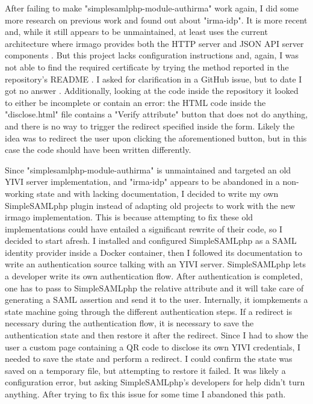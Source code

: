 \documentclass{report}
\begin{document}
After failing to make "simplesamlphp-module-authirma" work again, I did some more research on previous work and found out about "irma-idp". It is more recent and, while it still
appears to be unmaintained, at least uses the current architecture where irmago provides both the HTTP server and JSON API server components \cite{irma-docs-server}. But this
project lacks configuration instructions and, again, I was not able to find the required certificate by trying the method reported in the repository's README \cite{irma-idp}. I asked for 
clarification in a GitHub issue, but to date I got no answer \cite{irma-idp-issue}. Additionally, looking at the code inside the repository it looked to either be incomplete or
contain an error: the HTML code inside the "disclose.html" file contains a "Verify attribute" button that does not do anything, and there is no way to trigger the redirect specified
inside the form. Likely the idea was to redirect the user upon clicking the aforementioned button, but in this case the code should have been written differently. \par
Since "simplesamlphp-module-authirma" is unmaintained and targeted an old YIVI server implementation, and "irma-idp" appears to be abandoned in a non-working state and with lacking
documentation, I decided to write my own SimpleSAMLphp plugin instead of adapting old projects to work with the new irmago implementation. This is because attempting to fix these
old implementations could have entailed a significant rewrite of their code, so I decided to start afresh. I installed and configured SimpleSAMLphp \cite{simplesamlphp-docs} as a SAML identity
provider \cite{sstc-saml-core-errata-2.0-wd-07} inside a Docker container, then I followed its documentation to write an authentication source talking with an YIVI server.
SimpleSAMLphp lets a developer write its own authentication flow. After authentication is completed, one has to pass to SimpleSAMLphp the relative attribute and it will take care
of generating a SAML assertion and send it to the user. Internally, it iompkements a state machine going through the different authentication steps. If a redirect is necessary
during the authentication flow, it is necessary to save the authentication state and then  restore it after the redirect. Since I had to show the user a custom page containing a QR
code to disclose its own YIVI credentials, I needed to save the state and perform a redirect. I could confirm the state was saved on a temporary file, but attempting to restore it
failed. It was likely a configuration error, but asking SimpleSAMLphp's developers for help didn't turn anything. After trying to fix this issue for some time I abandoned this
path. 
\end{document}
